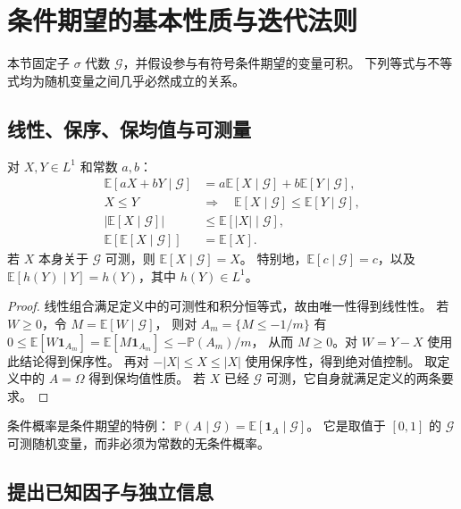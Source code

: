 \documentclass[UTF8,12pt,a4paper,fontset=fandol]{ctexart}
\begin{document}
\section{条件期望的基本性质与迭代法则}
\label{sec:conditional-properties}

本节固定子 $\sigma$ 代数 $\mathcal G$，并假设参与有符号条件期望的变量可积。
下列等式与不等式均为随机变量之间几乎必然成立的关系。

\subsection{线性、保序、保均值与可测量}

\begin{proposition}[基本运算性质]
\label{prop:conditional-basic}
对 $X,Y\in L^1$ 和常数 $a,b$：
\begin{align}
  \mathbb E[aX+bY\mid\mathcal G]
    &=a\mathbb E[X\mid\mathcal G]+b\mathbb E[Y\mid\mathcal G],
    \label{eq:conditional-linearity}\\
  X\leq Y\quad&\Longrightarrow\quad
    \mathbb E[X\mid\mathcal G]\leq\mathbb E[Y\mid\mathcal G],
    \label{eq:conditional-order}\\
  |\mathbb E[X\mid\mathcal G]|
    &\leq\mathbb E[|X|\mid\mathcal G],
    \label{eq:conditional-absolute}\\
  \mathbb E[\mathbb E[X\mid\mathcal G]]
    &=\mathbb E[X].
    \label{eq:conditional-total}
\end{align}
若 $X$ 本身关于 $\mathcal G$ 可测，则 $\mathbb E[X\mid\mathcal G]=X$。
特别地，$\mathbb E[c\mid\mathcal G]=c$，以及
$\mathbb E[h(Y)\mid Y]=h(Y)$，其中 $h(Y)\in L^1$。
\end{proposition}

\begin{proof}
线性组合满足定义中的可测性和积分恒等式，故由唯一性得到线性性。
若 $W\geq0$，令 $M=\mathbb E[W\mid\mathcal G]$，
则对 $A_m=\{M\leq-1/m\}$ 有
$0\leq\mathbb E[W\mathbf1_{A_m}]
=\mathbb E[M\mathbf1_{A_m}]\leq-\mathbb P(A_m)/m$，
从而 $M\geq0$。对 $W=Y-X$ 使用此结论得到保序性。
再对 $-|X|\leq X\leq|X|$ 使用保序性，得到绝对值控制。
取定义中的 $A=\Omega$ 得到保均值性质。
若 $X$ 已经 $\mathcal G$ 可测，它自身就满足定义的两条要求。
\end{proof}

条件概率是条件期望的特例：
$\mathbb P(A\mid\mathcal G)=\mathbb E[\mathbf1_A\mid\mathcal G]$。
它是取值于 $[0,1]$ 的 $\mathcal G$ 可测随机变量，而非必须为常数的无条件概率。

\subsection{提出已知因子与独立信息}
\end{document}
